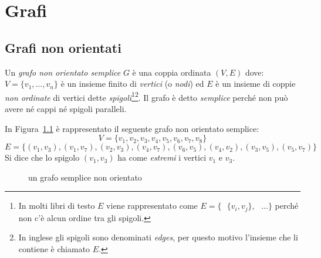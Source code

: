 \chapter{Grafi}

\section{Grafi non orientati}

\begin{defn}	
Un \emph{grafo non orientato semplice} $G$ è una coppia ordinata $(V,E)$ dove: $V=\{v_1,\dots,v_n\}$ è
un insieme finito di \emph{vertici} (o \emph{nodi}) ed $E$ è un insieme di coppie
\emph{non ordinate} di vertici dette \emph{spigoli}\footnote{ In molti libri di testo 
$E$ viene rappresentato come ${E = \{ \text{ } \{v_i,v_j\}, \text{ } \dots \}}$ perché non c'è
alcun ordine tra gli spigoli.}\footnote{In inglese gli spigoli sono denominati \emph{edges}, per
questo motivo l'insieme che li contiene è chiamato $E$.}. 
Il grafo è detto \emph{semplice} perché non può avere né cappi né spigoli paralleli.
\end{defn}

\begin{ese}
In Figura~\ref{fig:grf_semplice} è rappresentato il seguente grafo non orientato semplice:
\[V = \{ v_1, v_2, v_3, v_4, v_5, v_6, v_7, v_8 \}\]
\[E = \{ (v_1,v_3), (v_1,v_7), (v_2,v_3), (v_4,v_7),(v_6,v_5), (v_4,v_2), (v_3,v_5), (v_5,v_7) \}\]
Si dice che lo spigolo $(v_1,v_3)$ ha come \emph{estremi} i vertici $v_1$ e $v_3$.
\end{ese}
\begin{figure}[!ht]
    \centering
    \caption{un grafo semplice non orientato}
    \label{fig:grf_semplice}
\end{figure}

